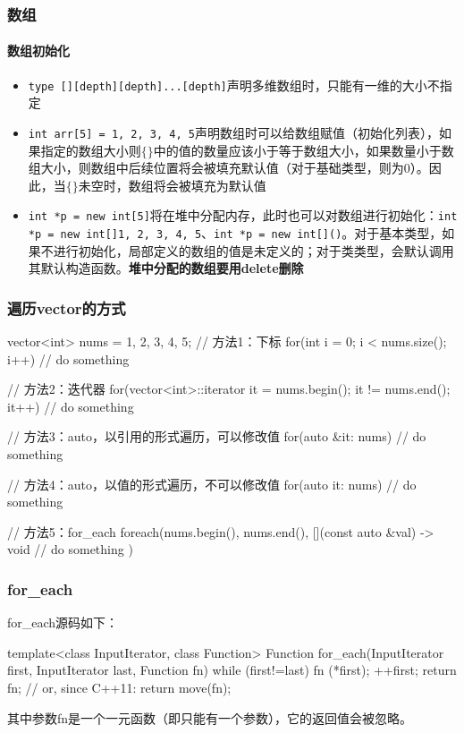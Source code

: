 \subsubsection{数组}
\paragraph{数组初始化}
\begin{itemize}
	\item \texttt{type [][depth][depth]...[depth]}声明多维数组时，只能有一维的大小不指定
	\item \texttt{int arr[5] = {1, 2, 3, 4, 5}}声明数组时可以给数组赋值（初始化列表），如果指定的数组大小则$\{\}$中的值的数量应该小于等于数组大小，如果数量小于数组大小，则数组中后续位置将会被填充默认值（对于基础类型，则为0）。因此，当$\{\}$未空时，数组将会被填充为默认值
	\item \texttt{int *p = new int[5]}将在堆中分配内存，此时也可以对数组进行初始化：\texttt{int *p = new int[]{1, 2, 3, 4, 5}}、\texttt{int *p = new int[]()}。对于基本类型，如果不进行初始化，局部定义的数组的值是未定义的；对于类类型，会默认调用其默认构造函数。\textbf{堆中分配的数组要用delete删除}
\end{itemize}

\subsubsection{遍历vector的方式}
\begin{cpp}
	vector<int> nums = {1, 2, 3, 4, 5};
	// 方法1：下标
	for(int i = 0; i < nums.size(); i++){
		// do something
	}
	
	// 方法2：迭代器
	for(vector<int>::iterator it = nums.begin(); it != nums.end(); it++){
		// do something
	}

	// 方法3：auto，以引用的形式遍历，可以修改值
	for(auto &it: nums){
		// do something 
	}

	// 方法4：auto，以值的形式遍历，不可以修改值
	for(auto it: nums){
		// do something
	}
	
	// 方法5：for_each
	foreach(nums.begin(), nums.end(),
			[](const auto &val) -> void { 
				// do something
			})
	
\end{cpp}

\subsubsection{for\_each}
for\_each源码如下：
\begin{cpp}
	template<class InputIterator, class Function>
	Function for_each(InputIterator first, InputIterator last, Function fn)
	{
		while (first!=last) {
			fn (*first);
			++first;
		}
		return fn;      // or, since C++11: return move(fn);
	}
\end{cpp}
其中参数fn是一个一元函数（即只能有一个参数），它的返回值会被忽略。

